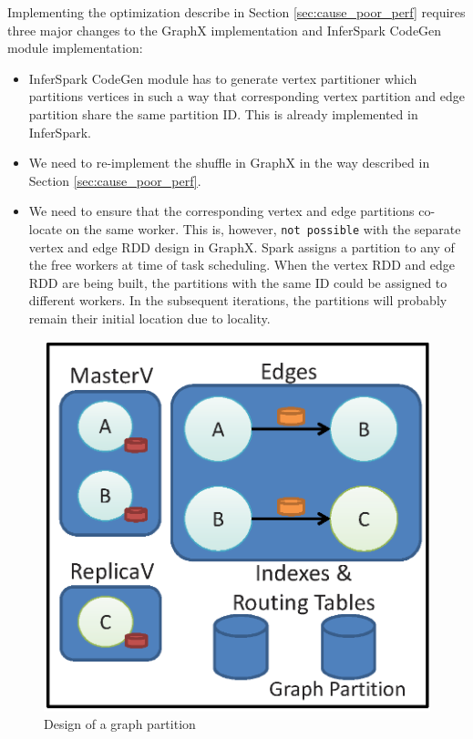Implementing the optimization describe in Section \ref{sec:cause_poor_perf}
requires three major changes to the GraphX implementation and InferSpark
CodeGen module implementation:
\begin{itemize}
	\item InferSpark CodeGen module has to generate vertex partitioner which
		partitions vertices in such a way that corresponding vertex partition and
		edge partition share the same partition ID. This is already implemented in
		InferSpark.

	\item We need to re-implement the shuffle in GraphX in the way described in
		Section \ref{sec:cause_poor_perf}.

	\item We need to ensure that the corresponding vertex and edge partitions
		co-locate on the same worker. This is, however, {\tt not possible} with
		the separate vertex and edge RDD design in GraphX. Spark assigns a
		partition to any of the free workers at time of task scheduling. When
		the vertex RDD and edge RDD are being built, the partitions with the same
		ID could be assigned to different workers. In the subsequent iterations,
		the partitions will probably remain their initial location due to
		locality.
\end{itemize}

\begin{figure}
	\centering
	\includegraphics[scale=0.5,clip]{figs/graph_partition.eps}
	\caption{Design of a graph partition}
	\label{fig:inferspark_graph_partition}
\end{figure}

